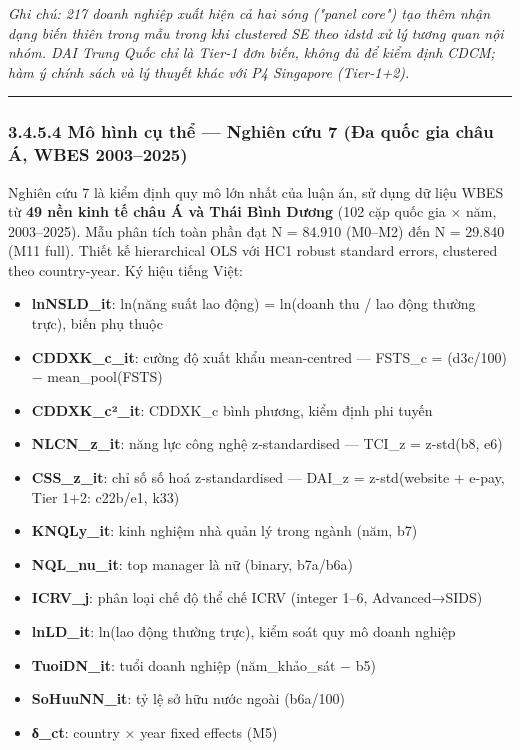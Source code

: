 \documentclass[12pt,a4paper]{article}
\providecommand{\tightlist}{\setlength{\itemsep}{0pt}\setlength{\parskip}{0pt}}
\begin{document}
\emph{Ghi chú: 217 doanh nghiệp xuất hiện cả hai sóng ("panel core") tạo
thêm nhận dạng biến thiên trong mẫu trong khi clustered SE theo idstd xử
lý tương quan nội nhóm. DAI Trung Quốc chỉ là Tier-1 đơn biến, không đủ
để kiểm định CDCM; hàm ý chính sách và lý thuyết khác với P4 Singapore
(Tier-1+2).}

\begin{center}\rule{0.5\linewidth}{0.5pt}\end{center}

\hypertarget{3454-muxf4-huxecnh-cux1ee5-thux1ec3--nghiuxean-cux1ee9u-7-ux111a-quux1ed1c-gia-chuxe2u-uxe1-wbes-20032025}{%
\subsubsection{3.4.5.4 Mô hình cụ thể --- Nghiên cứu 7 (Đa quốc gia châu
Á, WBES
2003--2025)}\label{3454-muxf4-huxecnh-cux1ee5-thux1ec3--nghiuxean-cux1ee9u-7-ux111a-quux1ed1c-gia-chuxe2u-uxe1-wbes-20032025}}

Nghiên cứu 7 là kiểm định quy mô lớn nhất của luận án, sử dụng dữ liệu
WBES từ \textbf{49 nền kinh tế châu Á và Thái Bình Dương} (102 cặp quốc
gia × năm, 2003--2025). Mẫu phân tích toàn phần đạt N = 84.910 (M0--M2)
đến N = 29.840 (M11 full). Thiết kế hierarchical OLS với HC1 robust
standard errors, clustered theo country-year. Ký hiệu tiếng Việt:

\begin{itemize}
\tightlist
\item
  \textbf{lnNSLD\_it}: ln(năng suất lao động) = ln(doanh thu / lao động
  thường trực), biến phụ thuộc
\item
  \textbf{CDDXK\_c\_it}: cường độ xuất khẩu mean-centred --- FSTS\_c =
  (d3c/100) − mean\_pool(FSTS)
\item
  \textbf{CDDXK\_c²\_it}: CDDXK\_c bình phương, kiểm định phi tuyến
\item
  \textbf{NLCN\_z\_it}: năng lực công nghệ z-standardised --- TCI\_z =
  z-std(b8, e6)
\item
  \textbf{CSS\_z\_it}: chỉ số số hoá z-standardised --- DAI\_z =
  z-std(website + e-pay, Tier 1+2: c22b/e1, k33)
\item
  \textbf{KNQLy\_it}: kinh nghiệm nhà quản lý trong ngành (năm, b7)
\item
  \textbf{NQL\_nu\_it}: top manager là nữ (binary, b7a/b6a)
\item
  \textbf{ICRV\_j}: phân loại chế độ thể chế ICRV (integer 1--6,
  Advanced→SIDS)
\item
  \textbf{lnLD\_it}: ln(lao động thường trực), kiểm soát quy mô doanh
  nghiệp
\item
  \textbf{TuoiDN\_it}: tuổi doanh nghiệp (năm\_khảo\_sát − b5)
\item
  \textbf{SoHuuNN\_it}: tỷ lệ sở hữu nước ngoài (b6a/100)
\item
  \textbf{δ\_ct}: country × year fixed effects (M5)
\end{itemize}
\end{document}

